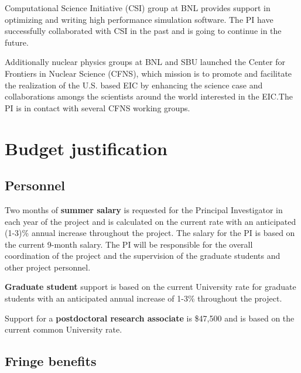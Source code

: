 \documentclass{DOEproposal}
\begin{document}
		Computational Science Initiative (CSI) group at BNL 
		provides support in optimizing and writing high performance 
		simulation software. The PI have successfully collaborated with 
		CSI in the past and is going to continue in the future. 

		Additionally nuclear physics  groups at BNL and SBU launched 
		the Center for Frontiers in Nuclear Science (CFNS), which mission
		is to promote and facilitate the realization of the U.S. based 
		EIC by enhancing the science case and collaborations amongs the 
		scientists around the world interested in the EIC.The PI is in contact
		with several CFNS working groups.  

\section{Budget justification}
        \label{sec:budget}
		\vspace{1.2em}			

		\subsection*{Personnel} 
		\vspace{0.5em}			

		\noindent
		Two months of {\bf summer salary} is requested for the Principal Investigator in each year of the project and
		is calculated on the current rate with an anticipated (1-3)\% annual increase throughout the project.  
		The salary for the PI is based on the current 9-month salary. 
		The PI will be responsible for the overall coordination of the project and the supervision of the graduate 
		students and other project personnel. 
	\vspace{0.5em}		

	\noindent
	{\bf Graduate student} support is based on the current University rate for graduate students with an anticipated 
		annual increase of 1-3\% throughout the project. 

	\vspace{0.5em}		

	\noindent
	Support for a {\bf postdoctoral research associate} is  \$47,500 and  is based on the current common University rate.
		\vspace{1.2em}			

		\subsection*{Fringe benefits} 
		\vspace{0.5em}			
	
\end{document}
